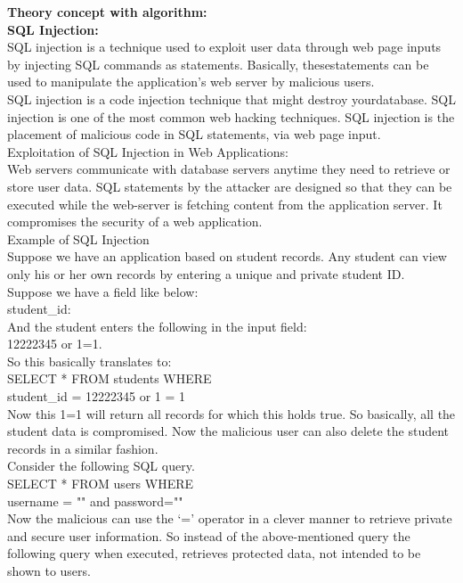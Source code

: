 \documentclass[a4paper, 12pt, fleqn]{article}
\begin{document}
\textbf{Theory concept with algorithm:} \\

\noindent
\textbf{SQL Injection:} \\
SQL injection is a technique used to exploit user data through web page
inputs by injecting SQL commands as statements. Basically, thesestatements can be used to manipulate the application’s web server by
malicious users. \\

\noindent
SQL injection is a code injection technique that might destroy yourdatabase.
SQL injection is one of the most common web hacking techniques.
SQL injection is the placement of malicious code in SQL statements, via web page input. \\

\noindent
Exploitation of SQL Injection in Web Applications: \\
Web servers communicate with database servers anytime they need to
retrieve or store user data. SQL statements by the attacker are designed
so that they can be executed while the web-server is fetching content from
the application server. It compromises the security of a web application. \\

\noindent
Example of SQL Injection \\
Suppose we have an application based on student records. Any student
can view only his or her own records by entering a unique and private
student ID. \\
Suppose we have a field like below: \\
student\_id: \\
And the student enters the following in the input field: \\
12222345 or 1=1. \\

\noindent
So this basically translates to: \\
SELECT * FROM students WHERE \\
student\_id = 12222345 or 1 = 1 \\
Now this 1=1 will return all records for which this holds true. So basically,
all the student data is compromised. Now the malicious user can also
delete the student records in a similar fashion. \\

\noindent
Consider the following SQL query. \\
SELECT * FROM users WHERE \\
username = "" and password="" \\
Now the malicious can use the ‘=’ operator in a clever manner to retrieve
private and secure user information. So instead of the above-mentioned
query the following query when executed, retrieves protected data, not
intended to be shown to users. \\
\end{document}
